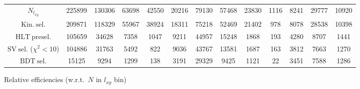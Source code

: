 \documentclass[10pt,a4paper]{article}
\begin{document}
\begin{landscape}
{\begin{tabular}{c|cccc|cccc|cccc}
\midrule
$N_{l_{xy}}$ & 225899 & 130306 & 63698 & 42550 & 20216 & 79130 & 57468 & 23830 & 1116 & 8241 & 29777 & 10920\\
$\mathrm{Kin.\ sel.}$ & 209871 & 118329 & 55967 & 38924 & 18311 & 75218 & 52469 & 21402 & 978 & 8078 & 28538 & 10398\\
$\mathrm{HLT\ presel.}$ & 105659 & 34628 & 7358 & 1047 & 9211 & 44957 & 15248 & 1868 & 193 & 4280 & 8707 & 1441\\
$\mathrm{SV\ sel.}$ ($\chi^2{<}10$) & 104886 & 31763 & 5492 & 822 & 9036 & 43767 & 13581 & 1687 & 163 & 3812 & 7663 & 1270\\
$\mathrm{BDT\ sel.}$ & 15125 & 9294 & 1299 & 138 & 3191 & 29329 & 9425 & 1121 & 22 & 3451 & 7588 & 1286\\
\bottomrule
\end{tabular}}

\vspace{18pt}

Relative efficiencies (w.r.t.\ $N$ in $l_{xy}$ bin)


\end{landscape}
\end{document}
